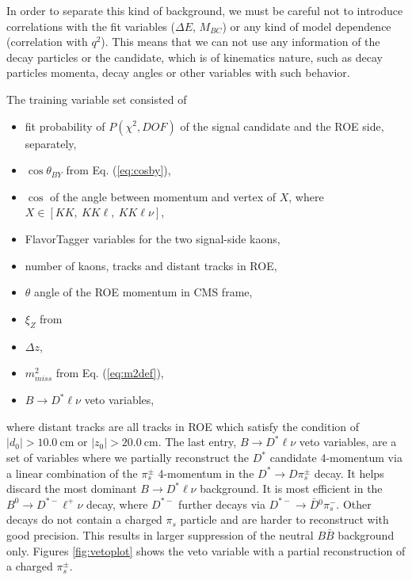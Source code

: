 \documentclass[headings=standardclasses,headings=big,oneside,a4paper,openany,12pt]{scrbook}
\newcommand {\e}[1]{\mathrm{~#1}}
\begin{document}
In order to separate this kind of background, we must be careful not to introduce correlations with the fit variables ($\Delta E$, $M_{BC}$) or any kind of model dependence (correlation with $q^2$). This means that we can not use any information of the decay particles or the candidate, which is of kinematics nature, such as decay particles momenta, decay angles or other variables with such behavior.

The training variable set consisted of
\begin{itemize}
\item fit probability of $P(\chi^2,DOF)$ of the signal candidate and the ROE side, separately,
\item $\cos\theta_{BY}$ from Eq. (\ref{eq:cosby}),
\item $\cos$ of the angle between momentum and vertex of $X$, where $X \in [KK,~KK\ell,~KK\ell\nu]$,
\item FlavorTagger variables for the two signal-side kaons,
\item number of kaons, tracks and distant tracks in ROE,
\item $\theta$ angle of the ROE momentum in CMS frame,
\item $\xi_Z$ from \cite{PhysRevD.83.032007}
\item $\Delta z$,
\item $m_{miss}^2$ from Eq. (\ref{eq:m2def}),
\item $B \to D^* \ell \nu$ veto variables,
\end{itemize}
where distant tracks are all tracks in ROE which satisfy the condition of $\vert d_0 \vert  > 10.0\e{cm}$ or $\vert z_0 \vert > 20.0\e{cm}$. The last entry, $B \to D^* \ell \nu$ veto variables, are a set of variables where we partially reconstruct the $D^*$ candidate 4-momentum via a linear combination of the $\pi^\pm_s$ 4-momentum in the $D^* \to D \pi_s^\pm$ decay. It helps discard the most dominant $B \to D^* \ell \nu$ background. It is most efficient in the $B^0 \to D^{*-} \ell^+ \nu$ decay, where $D^{*-}$ further decays via $D^{*-} \to \bar D {}^0 \pi^-_s$. Other decays do not contain a charged $\pi_s$ particle and are harder to reconstruct with good precision. This results in larger suppression of the neutral $B \bar B$ background only. Figures \ref{fig:vetoplot} shows the veto variable with a partial reconstruction of a charged $\pi_s^\pm$.
\end{document}
